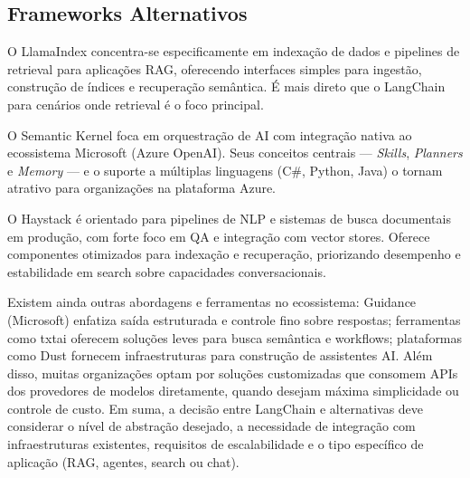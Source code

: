 \documentclass[12pt]{article}
\begin{document}
\subsection{Frameworks Alternativos}
\label{subsec:alternativas}

O LlamaIndex concentra-se especificamente em indexação de dados e pipelines de retrieval para aplicações RAG, oferecendo interfaces simples para ingestão, construção de índices e recuperação semântica. É mais direto que o LangChain para cenários onde retrieval é o foco principal. \cite{llamaindex2023, lewis2020retrieval}

O Semantic Kernel foca em orquestração de AI com integração nativa ao ecossistema Microsoft (Azure OpenAI). Seus conceitos centrais — \emph{Skills}, \emph{Planners} e \emph{Memory} — e o suporte a múltiplas linguagens (C\#, Python, Java) o tornam atrativo para organizações na plataforma Azure. \cite{semantickernel2023}


O Haystack é orientado para pipelines de NLP e sistemas de busca documentais em produção, com forte foco em QA e integração com vector stores. Oferece componentes otimizados para indexação e recuperação, priorizando desempenho e estabilidade em search sobre capacidades conversacionais. \cite{haystack2023, johnson2019billion}


 Existem ainda outras abordagens e ferramentas no ecossistema: Guidance (Microsoft) enfatiza saída estruturada e controle fino sobre respostas; ferramentas como txtai oferecem soluções leves para busca semântica e workflows; plataformas como Dust fornecem infraestruturas para construção de assistentes AI. Além disso, muitas organizações optam por soluções customizadas que consomem APIs dos provedores de modelos diretamente, quando desejam máxima simplicidade ou controle de custo. Em suma, a decisão entre LangChain e alternativas deve considerar o nível de abstração desejado, a necessidade de integração com infraestruturas existentes, requisitos de escalabilidade e o tipo específico de aplicação (RAG, agentes, search ou chat). \cite{langchain2023docs, langchain2023github}
\end{document}
